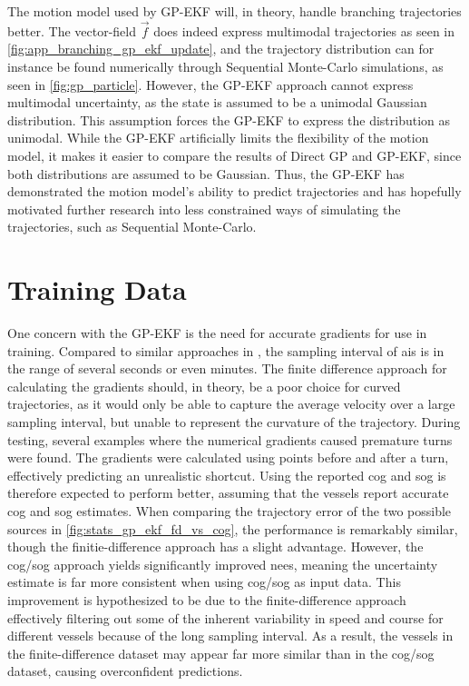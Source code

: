 The motion model used by GP-EKF will, in theory, handle branching trajectories better. The vector-field $\vec{f}$ does indeed express multimodal trajectories as seen in \cref{fig:app_branching_gp_ekf_update}, and the trajectory distribution can for instance be found numerically through Sequential Monte-Carlo simulations, as seen in \cref{fig:gp_particle}. However, the GP-EKF approach cannot express multimodal uncertainty, as the state is assumed to be a unimodal Gaussian distribution. This assumption forces the GP-EKF to express the distribution as unimodal. While the GP-EKF artificially limits the flexibility of the motion model, it makes it easier to compare the results of Direct GP and GP-EKF, since both distributions are assumed to be Gaussian.  Thus, the GP-EKF has demonstrated the motion model's ability to predict trajectories and has hopefully motivated further research into less constrained ways of simulating the trajectories, such as Sequential Monte-Carlo.

\section{Training Data}
One concern with the GP-EKF is the need for accurate gradients for use in training. Compared to similar approaches in \cite{vehicle_gp_prediction,pedestrian}, the sampling interval of \acrshort{ais} is in the range of several seconds or even minutes. The finite difference approach for calculating the gradients should, in theory, be a poor choice for curved trajectories, as it would only be able to capture the average velocity over a large sampling interval, but unable to represent the curvature of the trajectory. During testing, several examples where the numerical gradients caused premature turns were found. The gradients were calculated using points before and after a turn, effectively predicting an unrealistic shortcut.  Using the reported \acrshort{cog} and \acrshort{sog} is therefore expected to perform better, assuming that the vessels report accurate \acrshort{cog} and \acrshort{sog} estimates. When comparing the trajectory error of the two possible sources in \cref{fig:stats_gp_ekf_fd_vs_cog}, the performance is remarkably similar, though the finitie-difference approach has a slight advantage. However, the \acrshort{cog}/\acrshort{sog} approach yields significantly improved \acrshort{nees}, meaning the uncertainty estimate is far more consistent when using \acrshort{cog}/\acrshort{sog} as input data. This improvement is hypothesized to be due to the finite-difference approach effectively filtering out some of the inherent variability in speed and course for different vessels because of the long sampling interval. As a result, the vessels in the finite-difference dataset may appear far more similar than in the \acrshort{cog}/\acrshort{sog} dataset, causing overconfident predictions. 

